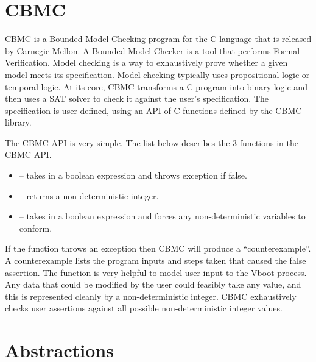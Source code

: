 \section{CBMC}

CBMC is a Bounded Model Checking program for the C language that is released by
Carnegie Mellon. 
A Bounded Model Checker is a tool that performs Formal Verification.
Model checking is a way to exhaustively prove whether a given model meets its
specification.
Model checking typically uses propositional logic or temporal logic. 
At its core, CBMC transforms a C program into binary logic and
then uses a SAT solver to check it against the user's specification. 
The specification is user defined, using an API of C functions defined by the
CBMC library. 


The CBMC API is very simple.
The list below describes the 3 functions in the CBMC API.

\begin{itemize}
    \item {} -- takes in a boolean expression and throws
        exception if false.
    \item {} -- returns a non-deterministic integer.
    \item {} -- takes in a boolean expression and forces any
        non-deterministic variables to conform.
\end{itemize}

If the  function throws an exception then CBMC will produce a ``counterexample''.
A counterexample lists the program inputs and steps taken that caused the false
assertion.
The  function is very helpful to model user input to the Vboot process.
Any data that could be modified by the user could feasibly take any
value, and this is represented cleanly by a non-deterministic integer.
CBMC exhaustively checks user assertions against all possible non-deterministic
integer values.

\section{Abstractions}

